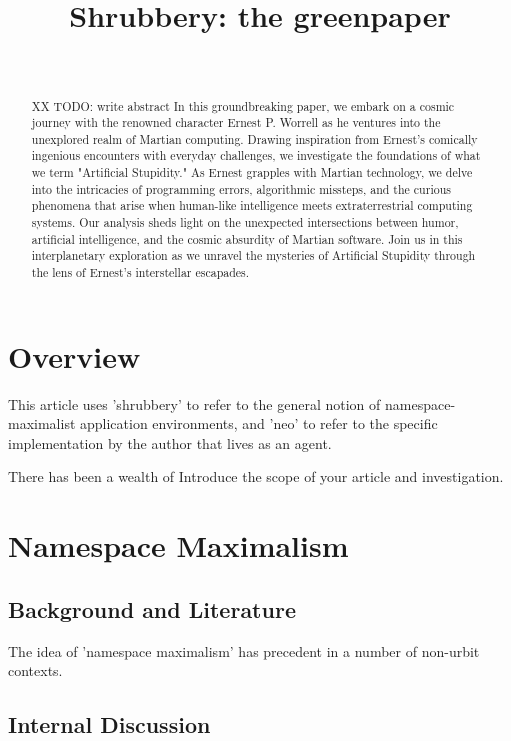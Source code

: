 \documentclass[twoside]{report}
\title{Shrubbery: the greenpaper}
\author{\authorname~\authorpatp \\ \affiliation}
\date{}
\begin{document}
\maketitle
\thispagestyle{firststyle}

\begin{abstract}
  XX TODO: write abstract
In this groundbreaking paper, we embark on a cosmic journey with the renowned character Ernest P. Worrell as he ventures into the unexplored realm of Martian computing. Drawing inspiration from Ernest's comically ingenious encounters with everyday challenges, we investigate the foundations of what we term "Artificial Stupidity." As Ernest grapples with Martian technology, we delve into the intricacies of programming errors, algorithmic missteps, and the curious phenomena that arise when human-like intelligence meets extraterrestrial computing systems. Our analysis sheds light on the unexpected intersections between humor, artificial intelligence, and the cosmic absurdity of Martian software. Join us in this interplanetary exploration as we unravel the mysteries of Artificial Stupidity through the lens of Ernest's interstellar escapades.
\end{abstract}

\setcounter{page}{1}

\tableofcontents


\chapter{Overview}

This article uses 'shrubbery' to refer to the general notion of namespace-maximalist application environments, and 'neo' to refer to the specific implementation by the author that lives as an agent.

There has been a wealth of
Introduce the scope of your article and investigation.

\chapter{Namespace Maximalism}

\section{Background and Literature}
The idea of 'namespace maximalism' has precedent in a number of non-urbit contexts.

\section{Internal Discussion}
\end{document}
